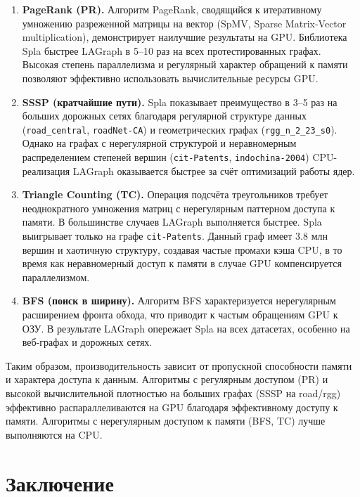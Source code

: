 \documentclass[a4paper]{article}
\begin{document}
	\begin{enumerate}
		\item \textbf{PageRank (PR).} Алгоритм PageRank, сводящийся к итеративному умножению разреженной матрицы на вектор (SpMV, Sparse Matrix-Vector multiplication), демонстрирует наилучшие результаты на GPU. Библиотека Spla быстрее LAGraph в 5--10 раз на всех протестированных графах. Высокая степень параллелизма и регулярный характер обращений к памяти позволяют эффективно использовать вычислительные ресурсы GPU.
		
		
		
		\item \textbf{SSSP (кратчайшие пути).} Spla показывает преимущество в 3--5 раз на больших дорожных сетях благодаря регулярной структуре данных (\texttt{road\_central}, \texttt{roadNet-CA}) и геометрических графах (\texttt{rgg\_n\_2\_23\_s0}). Однако на графах с нерегулярной структурой и неравномерным распределением степеней вершин (\texttt{cit-Patents}, \texttt{indochina-2004}) CPU-реализация LAGraph оказывается быстрее за счёт оптимизаций работы ядер.
		
		\item \textbf{Triangle Counting (TC).} Операция подсчёта треугольников требует неоднократного умножения матриц с нерегулярным паттерном доступа к памяти. В большинстве случаев LAGraph выполняется быстрее. Spla выигрывает только на графе \texttt{cit-Patents}. Данный граф имеет 3.8 млн вершин и хаотичную структуру, создавая частые промахи кэша CPU, в то время как неравномерный доступ к памяти в случае GPU компенсируется параллелизмом.
		
		\item \textbf{BFS (поиск в ширину).} Алгоритм BFS характеризуется нерегулярным расширением фронта обхода, что приводит к частым обращениям GPU к ОЗУ. В результате LAGraph опережает Spla на всех датасетах, особенно на веб-графах и дорожных сетях.
	\end{enumerate}
	
	
	Таким образом, производительность зависит от пропускной способности памяти и характера доступа к данным. Алгоритмы с регулярным доступом (PR) и высокой вычислительной плотностью на больших графах (SSSP на road/rgg) эффективно распараллеливаются на GPU благодаря эффективному доступу к памяти. Алгоритмы с нерегулярным доступом к памяти (BFS, TC) лучше выполняются на CPU.
	
	\section{Заключение}
	
\end{document}
